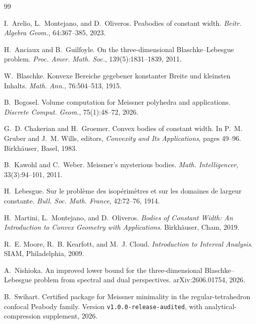 \documentclass[11pt]{article}
\numberwithin{equation}{section}
\theoremstyle{remark}
\begin{document}
\begin{thebibliography}{99}

I.~Arelio, L.~Montejano, and D.~Oliveros.
\newblock Peabodies of constant width.
\newblock \emph{Beitr. Algebra Geom.}, 64:367--385, 2023.

H.~Anciaux and B.~Guilfoyle.
\newblock On the three-dimensional Blaschke--Lebesgue problem.
\newblock \emph{Proc. Amer. Math. Soc.}, 139(5):1831--1839, 2011.

W.~Blaschke.
\newblock Konvexe Bereiche gegebener konstanter Breite und kleinsten Inhalts.
\newblock \emph{Math. Ann.}, 76:504--513, 1915.

B.~Bogosel.
\newblock Volume computation for Meissner polyhedra and applications.
\newblock \emph{Discrete Comput. Geom.}, 75(1):48--72, 2026.

G.~D. Chakerian and H.~Groemer.
\newblock Convex bodies of constant width.
\newblock In P.~M. Gruber and J.~M. Wills, editors, \emph{Convexity and Its Applications}, pages 49--96. Birkh\"auser, Basel, 1983.

B.~Kawohl and C.~Weber.
\newblock Meissner's mysterious bodies.
\newblock \emph{Math. Intelligencer}, 33(3):94--101, 2011.

H.~Lebesgue.
\newblock Sur le probl\`eme des isop\'erim\`etres et sur les domaines de largeur constante.
\newblock \emph{Bull. Soc. Math. France}, 42:72--76, 1914.

H.~Martini, L.~Montejano, and D.~Oliveros.
\newblock \emph{Bodies of Constant Width: An Introduction to Convex Geometry with Applications}.
\newblock Birkh\"auser, Cham, 2019.

R.~E. Moore, R.~B. Kearfott, and M.~J. Cloud.
\newblock \emph{Introduction to Interval Analysis}.
\newblock SIAM, Philadelphia, 2009.

A.~Nishioka.
\newblock An improved lower bound for the three-dimensional Blaschke--Lebesgue problem from spectral and dual perspectives.
\newblock arXiv:2606.01754, 2026.

B.~Swihart.
\newblock Certified package for Meissner minimality in the regular-tetrahedron confocal Peabody family.
\newblock Version \texttt{v1.0.0-release-audited}, with analytical-compression supplement, 2026.

\end{thebibliography}
\end{document}
